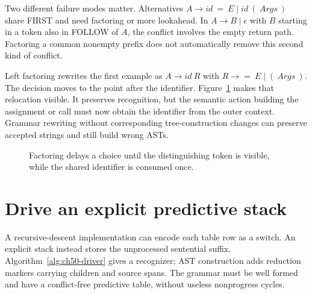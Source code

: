 Two different failure modes matter.
Alternatives $A\to\mathit{id}\ =\ E\mid\mathit{id}\ (\ Args\ )$ share FIRST and need factoring or more lookahead.
In $A\to B\mid\epsilon$ with $B$ starting in a token also in FOLLOW of $A$, the conflict involves the empty return path.
Factoring a common nonempty prefix does not automatically remove this second kind of conflict.

Left factoring rewrites the first example as $A\to\mathit{id}\ R$ with $R\to=\ E\mid(\ Args\ )$.
The decision moves to the point after the identifier.
Figure~\ref{fig:ch50-factoring} makes that relocation visible.
It preserves recognition, but the semantic action building the assignment or call must now obtain the identifier from the outer context.
Grammar rewriting without corresponding tree-construction changes can preserve accepted strings and still build wrong ASTs.

\begin{figure}[htbp]
\centering
{}
\caption{Factoring delays a choice until the distinguishing token is visible, while the shared identifier is consumed once.}
\label{fig:ch50-factoring}
\end{figure}

\section{Drive an explicit predictive stack}
\label{sec:ch50-driver}

A recursive-descent implementation can encode each table row as a switch.
An explicit stack instead stores the unprocessed sentential suffix.
Algorithm~\ref{alg:ch50-driver} gives a recognizer; AST construction adds reduction markers carrying children and source spans.
The grammar must be well formed and have a conflict-free predictive table, without useless nonprogress cycles.

